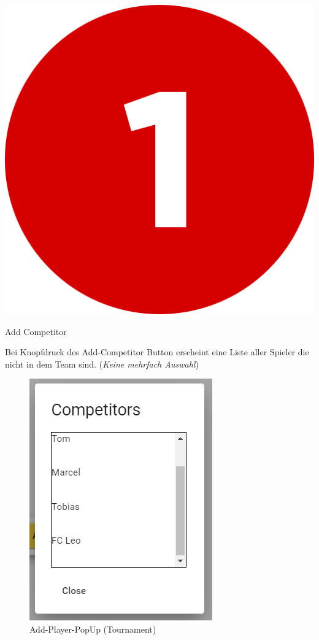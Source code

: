 \includegraphics[scale=0.05]{pics/user-guide/numbers/number-1.png} \begin{LARGE} Add Competitor \end{LARGE}

Bei Knopfdruck des Add-Competitor Button erscheint eine Liste aller Spieler die nicht in dem Team sind.
(\textit{Keine mehrfach Auswahl})

\begin{figure}[H]
    \includegraphics[scale=0.4]{pics/user-guide/add-competitor.PNG}
    \caption{Add-Player-PopUp (Tournament)}
\end{figure}

